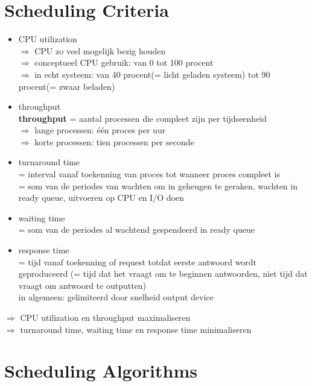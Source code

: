 \documentclass{report}
\begin{document}
\section{Scheduling Criteria}
\begin{itemize}
\item CPU utilization
\\$\Rightarrow$ CPU zo veel mogelijk bezig houden
\\$\Rightarrow$ conceptueel CPU gebruik: van 0 tot 100 procent
\\$\Rightarrow$ in echt systeem: van 40 procent(= licht geladen systeem) tot 90 procent(= zwaar beladen)
\item throughput
\\\textbf{throughput} = aantal processen die compleet zijn per tijdseenheid
\\$\Rightarrow$ lange processen: \'e\'en proces per uur
\\$\Rightarrow$ korte processen: tien processen per seconde
\item turnaround time
\\= interval vanaf toekenning van proces tot wanneer proces compleet is 
\\= som van de periodes van wachten om in geheugen te geraken, wachten in ready queue, uitvoeren op CPU en I/O doen
\item waiting time
\\= som van de periodes al wachtend gespendeerd in ready queue
\item response time
\\= tijd vanaf toekenning of request totdat eerste antwoord wordt geproduceerd (= tijd dat het vraagt om te beginnen antwoorden, niet tijd dat vraagt om antwoord te outputten)
\\in algemeen: gelimiteerd door snelheid output device
\end{itemize}
$\Rightarrow$ CPU utilization en throughput maximaliseren 
\\$\Rightarrow$ turnaround time, waiting time en response time minimaliseren

\section{Scheduling Algorithms}
\end{document}
